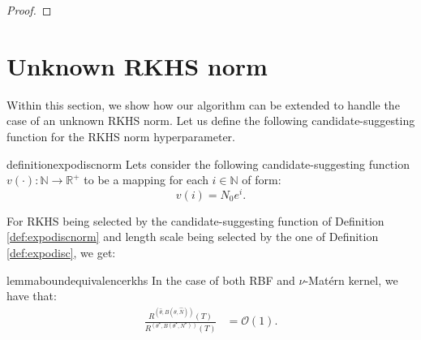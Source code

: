 \documentclass{article}
\theoremstyle{plain}
\theoremstyle{definition}
\theoremstyle{remark}
\theoremstyle{plain}
\begin{document}
\begin{proof}
\end{proof}

\section{Unknown RKHS norm} \label{app:lnb}

Within this section, we show how our algorithm can be extended to handle the case of an unknown RKHS norm. 
Let us define the following candidate-suggesting function for the RKHS norm hyperparameter.

\begin{restatable}[]{definition}{expodiscnorm}
\label{def:expodiscnorm} 
    Lets consider the following candidate-suggesting function $v(\cdot): \mathbb{N} \to \mathbb{R}^+$ to be a mapping for each $i \in \mathbb{N}$ of form: 
    \begin{equation*}
        v(i) = N_0  e^{i} .
    \end{equation*}

\end{restatable}
For RKHS being selected by the candidate-suggesting function of Definition \ref{def:expodiscnorm} and length scale being selected by the one of  Definition \ref{def:expodisc}, we get:
\begin{restatable}[]{lemma}{boundequivalencerkhs}
\label{lemma:boundequivalencerkhs}
In the case of both RBF and $\nu$-Matérn kernel, we have that:
    \begin{align*}
   \frac{R^{(\hat{\theta}, B(\hat{\theta}, \hat{N}))}(T)}{R^{(\theta^\star, B(\theta^\star, N^\star))}(T)} & = \mathcal{O}\left(1\right) .
\end{align*}
\end{restatable}
\end{document}
